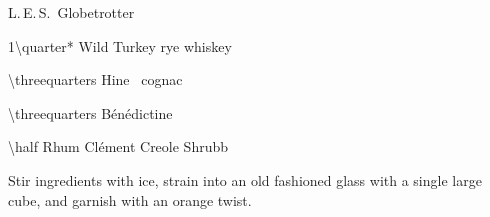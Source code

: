 \begin{Cocktail}[\PDT]{L.\,E.\,S.\ Globetrotter}
  \begin{Ingredients}
  \item \SI{1\quarter*}{\oz} Wild Turkey rye whiskey
  \item \SI{\threequarters}{\oz} Hine \vsop\ cognac
  \item \SI{\threequarters}{\oz} B\'en\'edictine
  \item \SI{\half}{\oz} Rhum Cl\'ement Creole Shrubb
  \end{Ingredients}
  
  \begin{Instructions}
	Stir ingredients with ice, strain into an old fashioned glass with a single large cube, and garnish with an orange twist.
  \end{Instructions}
\end{Cocktail}